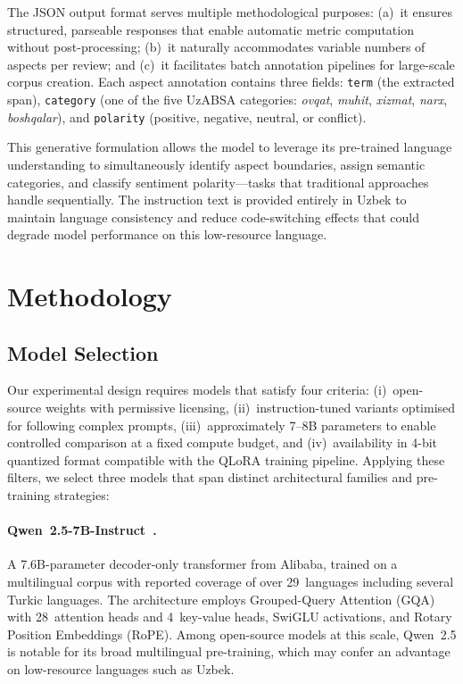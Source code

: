 \documentclass[runningheads]{llncs}
\begin{document}
The JSON output format serves multiple methodological purposes: (a)~it ensures structured, parseable responses that enable automatic metric computation without post-processing; (b)~it naturally accommodates variable numbers of aspects per review; and (c)~it facilitates batch annotation pipelines for large-scale corpus creation. Each aspect annotation contains three fields: \texttt{term} (the extracted span), \texttt{category} (one of the five UzABSA categories: \textit{ovqat}, \textit{muhit}, \textit{xizmat}, \textit{narx}, \textit{boshqalar}), and \texttt{polarity} (positive, negative, neutral, or conflict).

This generative formulation allows the model to leverage its pre-trained language understanding to simultaneously identify aspect boundaries, assign semantic categories, and classify sentiment polarity---tasks that traditional approaches handle sequentially. The instruction text is provided entirely in Uzbek to maintain language consistency and reduce code-switching effects that could degrade model performance on this low-resource language.


\section{Methodology}
\label{sec:methodology}

\subsection{Model Selection}
\label{sec:meth_models}

Our experimental design requires models that satisfy four criteria: (i)~open-source weights with permissive licensing, (ii)~instruction-tuned variants optimised for following complex prompts, (iii)~approximately 7--8B parameters to enable controlled comparison at a fixed compute budget, and (iv)~availability in 4-bit quantized format compatible with the QLoRA training pipeline. Applying these filters, we select three models that span distinct architectural families and pre-training strategies:

\paragraph{Qwen~2.5-7B-Instruct~\cite{Qwen2024-kr}.} A 7.6B-parameter decoder-only transformer from Alibaba, trained on a multilingual corpus with reported coverage of over 29~languages including several Turkic languages. The architecture employs Grouped-Query Attention (GQA) with 28~attention heads and 4~key-value heads, SwiGLU activations, and Rotary Position Embeddings (RoPE). Among open-source models at this scale, Qwen~2.5 is notable for its broad multilingual pre-training, which may confer an advantage on low-resource languages such as Uzbek.
\end{document}
